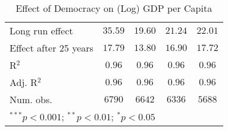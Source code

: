\begin{table}
\begin{center}
\begin{tabular}{l c c c c}
Long run effect       & $35.59$      & $19.60$       & $21.24$       & $22.01$       \\
Effect after 25 years & $17.79$      & $13.80$       & $16.90$       & $17.72$       \\
R$^2$                 & $0.96$       & $0.96$        & $0.96$        & $0.96$        \\
Adj. R$^2$            & $0.96$       & $0.96$        & $0.96$        & $0.96$        \\
Num. obs.             & $6790$       & $6642$        & $6336$        & $5688$        \\
\hline
\multicolumn{5}{l}{\scriptsize{$^{***}p<0.001$; $^{**}p<0.01$; $^{*}p<0.05$}}
\end{tabular}
\caption{Effect of Democracy on (Log) GDP per Capita}
\label{table:coefficients}
\end{center}
\end{table}
